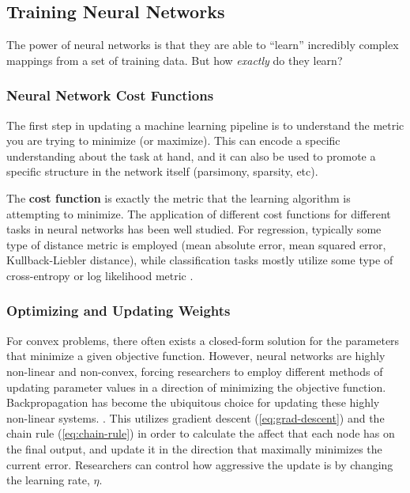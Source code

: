 \subsection{Training Neural Networks}

The power of neural networks is that they are able to ``learn'' incredibly complex mappings from a set of training data. But how \emph{exactly} do they learn?

\subsubsection{Neural Network Cost Functions}

The first step in updating a machine learning pipeline is to understand the metric you are trying to minimize (or maximize). This can encode a specific understanding about the task at hand, and it can also be used to promote a specific structure in the network itself (parsimony, sparsity, etc).

The \textbf{cost function} is exactly the metric that the learning algorithm is attempting to minimize. The application of different cost functions for different tasks in neural networks has been well studied. For regression, typically some type of distance metric is employed (mean absolute error, mean squared error, Kullback-Liebler distance), while classification tasks mostly utilize some type of cross-entropy or log likelihood metric \cite{paszkePyTorchImperativeStyle2019}.

\subsubsection{Optimizing and Updating Weights}

For convex problems, there often exists a closed-form solution for the parameters that minimize a given objective function. However, neural networks are highly non-linear and non-convex, forcing researchers to employ different methods of updating parameter values in a direction of minimizing the objective function. Backpropagation has become the ubiquitous choice for updating these highly non-linear systems. \cite{rumelhartLearningRepresentationsBackpropagating1986}. This utilizes gradient descent (\cref{eq:grad-descent}) and the chain rule (\cref{eq:chain-rule}) in order to calculate the affect that each node has on the final output, and update it in the direction that maximally minimizes the current error. Researchers can control how aggressive the update is by changing the learning rate, $\eta$.

